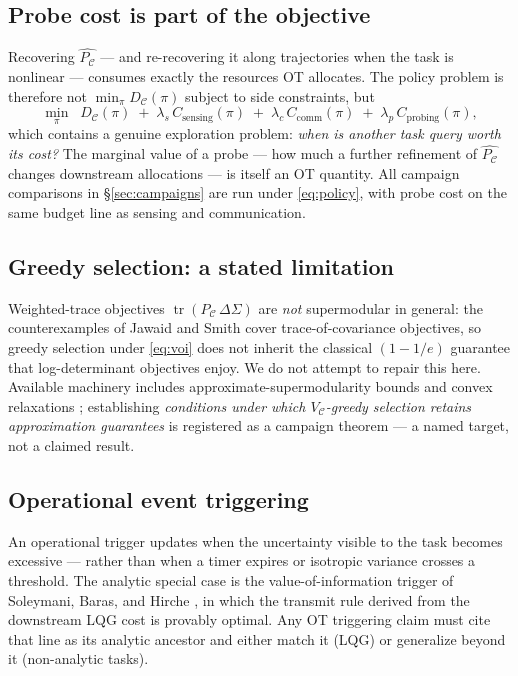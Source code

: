 \documentclass[letterpaper,onecolumn]{IEEEtran}
\theoremstyle{definition}
\theoremstyle{remark}
\newcommand{\PC}{P_{\mathcal{C}}}
\newcommand{\tr}{\operatorname{tr}}
\newcommand{\C}{\mathcal{C}}
\newcommand{\Sig}{\Sigma}
\newcommand{\VC}{V_{\mathcal{C}}}
\begin{document}
\subsection{Probe cost is part of the objective}
\label{sec:probecost}

Recovering $\widehat{\PC}$ --- and re-recovering it along trajectories when
the task is nonlinear --- consumes exactly the resources OT allocates.
The policy problem is therefore not
$\min_\pi D_\C(\pi)$ subject to side constraints, but
\begin{equation}
\label{eq:policy}
\min_{\pi}\;\; D_\C(\pi)
\;+\;\lambda_s\,C_{\mathrm{sensing}}(\pi)
\;+\;\lambda_c\,C_{\mathrm{comm}}(\pi)
\;+\;\lambda_p\,C_{\mathrm{probing}}(\pi),
\end{equation}
which contains a genuine exploration problem: \emph{when is another task
query worth its cost?} The marginal value of a probe --- how much a further
refinement of $\widehat{\PC}$ changes downstream allocations --- is itself an
OT quantity. All campaign comparisons in \S\ref{sec:campaigns} are run under
\eqref{eq:policy}, with probe cost on the same budget line as sensing and
communication.

\subsection{Greedy selection: a stated limitation}
\label{sec:greedy}

Weighted-trace objectives $\tr(\PC\,\Delta\Sig)$ are \emph{not} supermodular
in general: the counterexamples of Jawaid and Smith \cite{jawaidsmith2015}
cover trace-of-covariance objectives, so greedy selection under
\eqref{eq:voi} does not inherit the classical $(1-1/e)$ guarantee that
log-determinant objectives enjoy. We do not attempt to repair this here.
Available machinery includes approximate-supermodularity bounds
\cite{chamon2021} and convex relaxations \cite{joshiboyd2009}; establishing
\emph{conditions under which $\VC$-greedy selection retains approximation
guarantees} is registered as a campaign theorem --- a named target, not a
claimed result.

\subsection{Operational event triggering}
\label{sec:trigger}

An operational trigger updates when the uncertainty visible to the task
becomes excessive --- rather than when a timer expires or isotropic variance
crosses a threshold. The analytic special case is the value-of-information
trigger of Soleymani, Baras, and Hirche \cite{soleymani2022,soleymani2023},
in which the transmit rule derived from the downstream LQG cost is provably
optimal. Any OT triggering claim must cite that line as its analytic
ancestor and either match it (LQG) or generalize beyond it (non-analytic
tasks).
\end{document}
